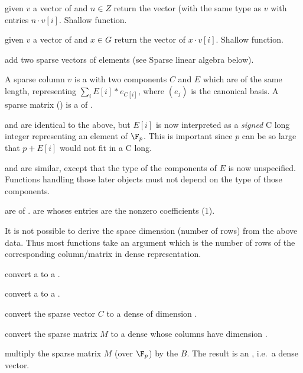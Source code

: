  given $v$ a vector of  and $n\in
Z$ return the vector (with the same type as $v$ with entries $n \cdot v[i]$.
Shallow function.

 given $v$ a vector of  and $x\in
G$ return the vector of $x \cdot v[i]$. Shallow function.

 add two sparse vectors of
 elements (see Sparse linear algebra below).


A sparse column  $v$ is a  with two components $C$ and $E$
which are  of the same length, representing $\sum_i
E[i]*e_{C[i]}$, where $(e_j)$ is the canonical basis. A sparse matrix
() is a  of .

 and  are identical to the above, but $E[i]$ is now
interpreted as a \emph{signed} C long integer representing an element of
$\F_p$. This is important since $p$ can be so large that $p+E[i]$ would not
fit in a C long.

 and  are similar, except that the type of the components
of $E$ is now unspecified. Functions handling those later objects
must not depend on the type of those components.

 are  of .  are  whoses
entries are the nonzero coefficients ($1$).

It is not possible to derive the space dimension (number of rows) from the
above data. Thus most functions take an argument  which is the
number of rows of the corresponding column/matrix in dense representation.

 convert a  to a .

 convert a  to a .

 convert the sparse vector $C$
to a dense  of dimension .

 convert the sparse matrix $M$
to a dense  whose columns have dimension .

 multiply the sparse matrix $M$
(over $\F_p$) by the  $B$. The result is an , i.e.~a
dense vector.


